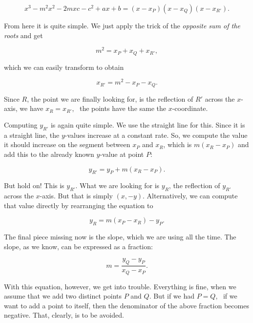 \documentclass[tikz]{scrreprt}
\begin{document}
\begin{equation}  
x^3 - m^2x^2 - 2mxc - c^2 + ax + b = (x-x_P)(x-x_Q)(x-x_{R'}).
\end{equation}

From here it is quite simple. 
We just apply the trick of the 
\emph{opposite sum of the roots}
and get

\begin{equation}  
m^2 = x_P + x_Q + x_{R'},
\end{equation}

which we can easily transform to obtain

\begin{equation}  
x_{R'} = m^2 - x_P - x_Q. 
\end{equation}

Since $R$, the point we are finally looking for,
is the reflection of $R'$ across the $x$-axis,
we have $x_{R} = x_{R'}$, \ie\ the points have
the same the $x$-coordinate.

Computing $y_{R'}$ is again quite simple.
We use the straight line for this. 
Since it is a straight line, the $y$-values
increase at a constant rate. So, we compute
the value it should increase on the segment
between $x_P$ and $x_R$, which is
$m(x_R - x_P)$ and add this to the 
already known $y$-value at point $P$:

\begin{equation}
y_{R'} = y_P + m(x_R - x_P).
\end{equation}

But hold on! This is $y_{R'}$. 
What we are looking for is $y_R$,
the reflection of $y_{R'}$ across the
$x$-axis. 
But that is simply  $(x,-y)$. 
Alternatively, we can compute that 
value directly by rearranging the 
equation to

\begin{equation}
y_R = m(x_P - x_R)-y_P.
\end{equation}

The final piece missing now is the slope,
which we are using all the time.
The slope, as we know, can be expressed
as a fraction:

\begin{equation}
m = \frac{y_Q - y_P}{x_Q - x_P}.
\end{equation}

With this equation, however,
we get into trouble. Everything is fine,
when we assume that we add two distinct
points $P$ and $Q$. But if we had
$P = Q$, \ie\ if we want to add a point
to itself, then the denominator of
the above fraction becomes negative.
That, clearly, is to be avoided.
\end{document}
